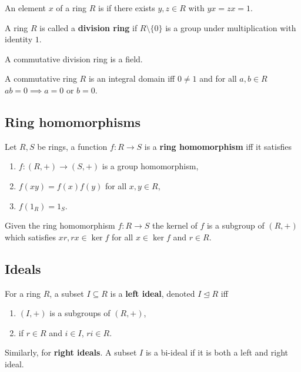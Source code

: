 \documentclass[../Year2.tex]{subfiles}
\begin{document}
\begin{definition}[Invertible]
    An element $x$ of a ring $R$ is  if there exists $y,z\in R$ with $yx=zx=1$.
\end{definition}

\begin{definition}
    A ring $R$ is called a \textbf{division ring} if $R\setminus\{0\}$ is a group under multiplication with identity $1$.
\end{definition}

\begin{remark}
    A commutative division ring is a field.
\end{remark}

\begin{definition}
    A commutative ring $R$ is an integral domain iff $0\neq1$ and for all $a,b\in R$ $ab=0\implies a=0$ or $b=0$.
\end{definition}

\subsection{Ring homomorphisms}

\begin{definition}
    Let $R,S$ be rings, a function $f:R\rightarrow S$ is a \textbf{ring homomorphism} iff it satisfies \begin{enumerate}
        \item $f:(R,+)\rightarrow (S,+)$ is a group homomorphism,
        \item $f(xy)=f(x)f(y)$ for all $x,y\in R$,
        \item $f(1_R)=1_S$.
    \end{enumerate}
\end{definition}

\begin{lemma}
    Given the ring homomorphism $f:R\rightarrow S$ the kernel of $f$ is a subgroup of $(R,+)$ which satisfies $xr,rx\in\ker f$ for all $x\in \ker f$ and $r\in R$.
\end{lemma}

\subsection{Ideals}

\begin{definition}[Ideal]
    For a ring $R$, a subset $I\subseteq R$ is a \textbf{left ideal}, denoted $I\unlhd R$ iff \begin{enumerate}
        \item $(I,+)$ is a subgroups of $(R,+)$,
        \item if $r\in R$ and $i\in I$, $ri\in R$.
    \end{enumerate} Similarly, for \textbf{right ideals}. A subset $I$ is a bi-ideal if it is both a left and right ideal.
\end{definition}
\end{document}
